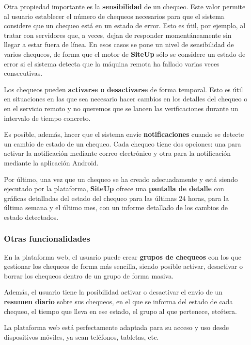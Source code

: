 \documentclass[a4paper,12pt]{article}
\begin{document}
Otra propiedad importante es la \textbf{sensibilidad} de un chequeo. Este valor
permite al usuario establecer el número de chequeos necesarios para que el
sistema considere que un chequeo está en un estado de error. Esto es útil, por
ejemplo, al tratar con servidores que, a veces, dejan de responder
momentáneamente sin llegar a estar fuera de línea. En esos casos se pone un
nivel de sensibilidad de varios chequeos, de forma que el motor de
\textbf{SiteUp} sólo se considere un estado de error si el sistema detecta que
la máquina remota ha fallado varias veces consecutivas.

Los chequeos pueden \textbf{activarse o desactivarse} de forma temporal. Esto es
útil en situaciones en las que sea necesario hacer cambios en los detalles del
chequeo o en el servicio remoto y no queremos que se lancen las verificaciones
durante un intervalo de tiempo concreto. 

Es posible, además, hacer que el sistema envíe \textbf{notificaciones} cuando se
detecte un cambio de estado de un chequeo. Cada chequeo tiene dos opciones: una
para activar la notificación mediante correo electrónico y otra para la
notificación mediante la aplicación Android.

Por último, una vez que un chequeo se ha creado adecuadamente y está siendo
ejecutado por la plataforma, \textbf{SiteUp} ofrece una \textbf{pantalla de
  detalle} con gráficas detalladas del estado del chequeo para las últimas 24
horas, para la última semana y el último mes, con un informe detallado de los
cambios de estado detectados.

\subsubsection{Otras funcionalidades}

En la plataforma web, el usuario puede crear \textbf{grupos de chequeos} con los
que gestionar los chequeos de forma más sencilla, siendo posible activar,
desactivar o borrar los chequeos dentro de un grupo de forma masiva.

Además, el usuario tiene la posibilidad activar o desactivar el envío de un
\textbf{resumen diario} sobre sus chequeos, en el que se informa del estado de
cada chequeo, el tiempo que lleva en ese estado, el grupo al que pertenece,
etcétera.

La plataforma web está perfectamente adaptada para su acceso y uso desde
dispositivos móviles, ya sean teléfonos, tabletas, etc.
\end{document}
